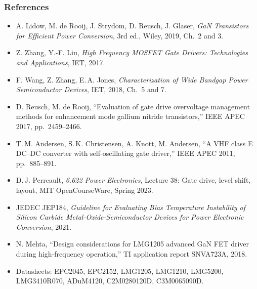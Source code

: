 \begin{frame}
	\frametitle{References}
	\scriptsize
	\begin{itemize}
		\item A. Lidow, M. de Rooij, J. Strydom, D. Reusch, J. Glaser, \textit{GaN Transistors for Efficient Power Conversion}, 3rd ed., Wiley, 2019, Ch.\ 2 and 3.
		\item Z. Zhang, Y.-F. Liu, \textit{High Frequency MOSFET Gate Drivers: Technologies and Applications}, IET, 2017.
		\item F. Wang, Z. Zhang, E.\,A. Jones, \textit{Characterization of Wide Bandgap Power Semiconductor Devices}, IET, 2018, Ch.\ 5 and 7.
		\item D. Reusch, M. de Rooij, ``Evaluation of gate drive overvoltage management methods for enhancement mode gallium nitride transistors,'' IEEE APEC 2017, pp.\ 2459--2466.
		\item T.\,M. Andersen, S.\,K. Christensen, A. Knott, M. Andersen, ``A VHF class E DC--DC converter with self-oscillating gate driver,'' IEEE APEC 2011, pp.\ 885--891.
		\item D.\,J. Perreault, \textit{6.622 Power Electronics}, Lecture 38: Gate drive, level shift, layout, MIT OpenCourseWare, Spring 2023.
		\item JEDEC JEP184, \textit{Guideline for Evaluating Bias Temperature Instability of Silicon Carbide Metal-Oxide-Semiconductor Devices for Power Electronic Conversion}, 2021.
		\item N. Mehta, ``Design considerations for LMG1205 advanced GaN FET driver during high-frequency operation,'' TI application report SNVA723A, 2018.
		\item Datasheets: EPC2045, EPC2152, LMG1205, LMG1210, LMG5200, LMG3410R070, ADuM4120, C2M0280120D, C3M0065090D.
	\end{itemize}
\end{frame}
